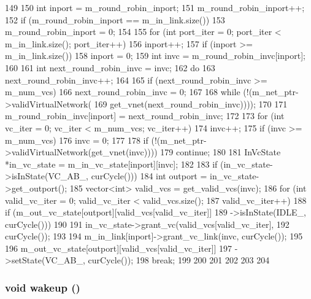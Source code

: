 \begin{DoxyCode}
149 {
150     int inport = m_round_robin_inport;
151     m_round_robin_inport++;
152     if (m_round_robin_inport == m_in_link.size())
153         m_round_robin_inport = 0;
154 
155     for (int port_iter = 0; port_iter < m_in_link.size(); port_iter++) {
156         inport++;
157         if (inport >= m_in_link.size())
158             inport = 0;
159         int invc = m_round_robin_invc[inport];
160 
161         int next_round_robin_invc = invc;
162         do {
163             next_round_robin_invc++;
164 
165             if (next_round_robin_invc >= m_num_vcs)
166                 next_round_robin_invc = 0;
167 
168         } while (!(m_net_ptr->validVirtualNetwork(
169                    get_vnet(next_round_robin_invc))));
170 
171         m_round_robin_invc[inport] = next_round_robin_invc;
172 
173         for (int vc_iter = 0; vc_iter < m_num_vcs; vc_iter++) {
174             invc++;
175             if (invc >= m_num_vcs)
176                 invc = 0;
177 
178             if (!(m_net_ptr->validVirtualNetwork(get_vnet(invc))))
179                 continue;
180 
181             InVcState *in_vc_state = m_in_vc_state[inport][invc];
182 
183             if (in_vc_state->isInState(VC_AB_, curCycle())) {
184                 int outport = in_vc_state->get_outport();
185                 vector<int> valid_vcs = get_valid_vcs(invc);
186                 for (int valid_vc_iter = 0; valid_vc_iter < valid_vcs.size();
187                         valid_vc_iter++) {
188                     if (m_out_vc_state[outport][valid_vcs[valid_vc_iter]]
189                             ->isInState(IDLE_, curCycle())) {
190 
191                         in_vc_state->grant_vc(valid_vcs[valid_vc_iter],
192                                 curCycle());
193 
194                         m_in_link[inport]->grant_vc_link(invc, curCycle());
195 
196                         m_out_vc_state[outport][valid_vcs[valid_vc_iter]]
197                             ->setState(VC_AB_, curCycle());
198                         break;
199                     }
200                 }
201             }
202         }
203     }
204 }
\end{DoxyCode}
\hypertarget{classRouter_ae674290a26ecbd622c5160e38e8a4fe9}{
\subsubsection[{wakeup}]{\setlength{\rightskip}{0pt plus 5cm}void wakeup ()}}
\label{classRouter_ae674290a26ecbd622c5160e38e8a4fe9}


